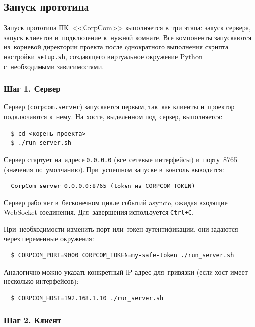 \subsection{Запуск прототипа}

Запуск прототипа ПК~<<CorpCom>> выполняется в~три этапа: запуск сервера, запуск клиентов и~подключение к~нужной комнате. Все компоненты запускаются из~корневой директории проекта после однократного выполнения скрипта настройки \texttt{setup.sh}, создающего виртуальное окружение Python с~необходимыми зависимостями.

\subsubsection{Шаг 1. Сервер}

Сервер (\texttt{corpcom.server}) запускается первым, так~как клиенты и~проектор подключаются к~нему. На~хосте, выделенном под~сервер, выполняется:

\begin{verbatim}
  $ cd <корень проекта>
  $ ./run_server.sh
\end{verbatim}

Сервер стартует на~адресе \texttt{0.0.0.0} (все~сетевые интерфейсы) и~порту~8765 (значения по~умолчанию). При~успешном запуске в~консоль выводится:

\begin{verbatim}
  CorpCom server 0.0.0.0:8765 (token из CORPCOM_TOKEN)
\end{verbatim}

Сервер работает в~бесконечном цикле событий asyncio, ожидая входящие WebSocket-соединения. Для~завершения используется \texttt{Ctrl+C}.

При~необходимости изменить порт или~токен аутентификации, они задаются через переменные окружения:

\begin{verbatim}
  $ CORPCOM_PORT=9000 CORPCOM_TOKEN=my-safe-token ./run_server.sh
\end{verbatim}

Аналогично можно указать конкретный IP-адрес для~привязки (если хост имеет несколько интерфейсов):

\begin{verbatim}
  $ CORPCOM_HOST=192.168.1.10 ./run_server.sh
\end{verbatim}

\subsubsection{Шаг 2. Клиент}

